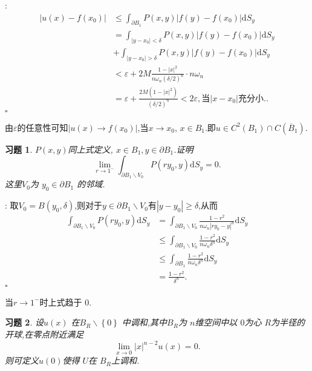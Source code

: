 \documentclass[a4paper]{article}
\newtheorem*{exe}{习题}
\newenvironment{sol}{{\noindent\bfseries 解}:}{\hfill $\square$\par}
\newenvironment{pro}{{\noindent\bfseries 证明}:}{\hfill $\square$\par}
\begin{document}
\begin{sol}
  \begin{align*}
    \left| u(x)-f(x_0) \right| &\le \int_{\partial B_1}P(x,y)\left| f(y)-f(x_0) \right| \mathrm{d}S_y\\
    &=\int_{\left| y-x_0 \right| <\delta}P(x,y)\left| f(y)-f(x_0) \right| \mathrm{d}S_y\\
    &+\int_{\left| y-x_0 \right| >\delta}P(x,y)|f(y)-f(x_0)|\mathrm{d}S_y\\
    &<\varepsilon +2M \frac{1-\left| x \right| ^2}{n\omega_n\left( \delta\slash 2\right)^n }\cdot n\omega_n\\ 
    &=\varepsilon+\frac{2M\left( 1-\left| x \right| ^2 \right) }{\left( \delta\slash 2 \right)^n }<2\varepsilon,\text{当}\left| x-x_0 \right| \text{充分小}.
  .\end{align*}
\end{sol}
由$\varepsilon$的任意性可知$\left| u(x)\to f(x_0) \right| $,当$x\to x_0$, $x\in  B_1$.即$u\in C^2\left( B_1 \right)\cap C\left( \overline{B}_1 \right)  $.
\begin{exe}
  $P(x,y)$同上式定义, $x\in B_1,y\in \partial B_1$.证明
  \[
    \lim_{r\to 1^-}\int_{\partial B_1\backslash V_0}P(ry_0,y)\mathrm{d}S_y=0
  .\] 
  这里$V_0$为 $y_0\in \partial B_1$ 的邻域. 
\end{exe}
\begin{pro}
  取$V_0=B\left( y_0,\delta \right) $,则对于$y\in \partial B_1\backslash V_0$有$\left| y-y_0 \right|\ge \delta $,从而
  \begin{align*}
    \int_{\partial B_1\backslash V_0}P(ry_0,y)\mathrm{d}S_y&=\int_{\partial B_1\backslash V_0} \frac{1-r^2}{n\omega_n\left| ry_0-y \right| ^{n}}\mathrm{d}S_y\\
    &\le \int_{\partial B_1\backslash V_0} \frac{1-r^2}{n\omega_n\delta^n}\mathrm{d}S_y\\ 
    &\le \int_{\partial B_1} \frac{1-r^2}{n\omega_n\delta^n}\mathrm{d}S_y\\
    &=\frac{1-r^2}{\delta^n}
  .\end{align*}
\end{pro}
当$r\to 1^-$时上式趋于 $0$.
\begin{exe}
  设$u(x)$ 在$B_R\backslash \left\{ 0 \right\} $ 中调和,其中$B_R$为 $n$维空间中以 $0$为心 $R$为半径的开球,在零点附近满足
   \[
     \lim_{x\to 0}\left| x \right| ^{n-2}u(x)=0
  .\] 
  则可定义$u(0)$使得 $U$在 $B_R$上调和.
\end{exe}
\end{document}
